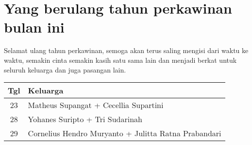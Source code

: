 \section*{Yang berulang tahun perkawinan  bulan ini}

Selamat ulang tahun perkawinan, semoga akan terus saling mengisi dari waktu ke waktu, semakin cinta semakin kasih satu sama lain dan menjadi berkat untuk seluruh keluarga dan juga pasangan lain.

\begin{longtable}{|c|l|} 
\hline Tgl & Keluarga \\ \hline
23 & Matheus Supangat + Cecellia Supartini \\ 
28 & Yohanes Suripto +  Tri Sudarinah \\ 
29 & Cornelius Hendro Muryanto + Julitta Ratna Prabandari \\ \hline 
\end{longtable}

